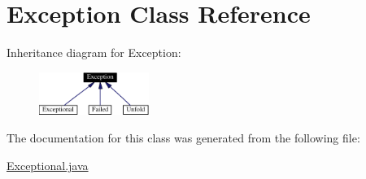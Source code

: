 \hypertarget{classException}{
\section{Exception  Class Reference}
\label{classException}
}
Inheritance diagram for Exception:\begin{figure}[H]
\begin{center}
\leavevmode
\includegraphics[width=101pt]{classException__inherit__graph}
\end{center}
\end{figure}


The documentation for this class was generated from the following file:\begin{CompactItemize}
\item 
\hyperlink{Exceptional_8java-source}{Exceptional.java}\end{CompactItemize}
